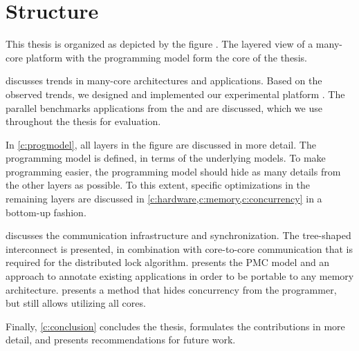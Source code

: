 \section{Structure}

This thesis is organized as depicted by the figure .
The layered view of a many-core platform with the programming model form the core of the thesis.

 discusses trends in many-core architectures and applications.
Based on the observed trends, we designed and implemented our experimental platform \Starburst.
The parallel benchmarks applications from the \SPLASH and \NoFib are discussed, which we use throughout the thesis for evaluation.

In \cref{c:progmodel}, all layers in the figure are discussed in more detail.
The programming model is defined, in terms of the underlying models.
To make programming easier, the programming model should hide as many details from the other layers as possible.
To this extent, specific optimizations in the remaining layers are discussed in \cref{c:hardware,c:memory,c:concurrency} in a bottom-up fashion.

 discusses the communication infrastructure and synchronization.
The tree-shaped interconnect is presented, in combination with core-to-core communication that is required for the distributed lock algorithm.
 presents the \ac{PMC} model and an approach to annotate existing applications in order to be portable to any memory architecture.
 presents a method that hides concurrency from the programmer, but still allows utilizing all cores.

Finally, \cref{c:conclusion} concludes the thesis, formulates the contributions in more detail, and presents recommendations for future work.

